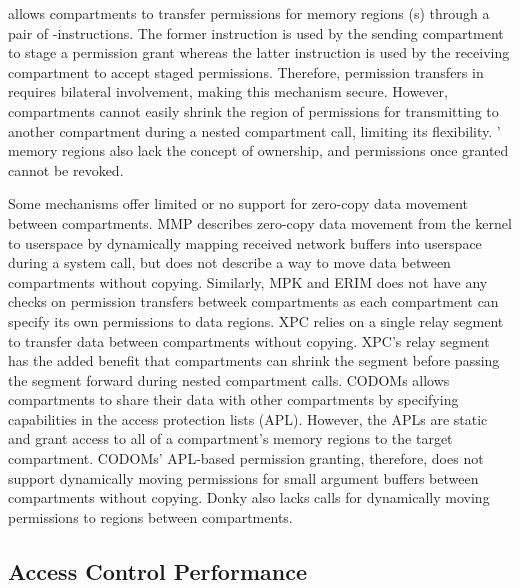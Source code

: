 \seccells allows compartments to transfer permissions for memory 
regions (\cell{}s) through a pair of \scgrant-\screcv instructions.
The former instruction is used by the sending compartment to stage a 
permission grant whereas the latter instruction is used by the receiving
compartment to accept staged permissions.
Therefore, permission transfers in \seccells requires bilateral involvement,
making this mechanism secure.
However, compartments cannot easily shrink the region of permissions
for transmitting to another compartment during a nested compartment call,
limiting its flexibility.
\seccells' memory regions also lack the concept of ownership, and
permissions once granted cannot be revoked.

Some mechanisms offer limited or no support for zero-copy data
movement between compartments.
MMP describes zero-copy data movement from the kernel to userspace
by dynamically mapping received network buffers into userspace
during a  system call, but does not describe a way to
move data between compartments without copying.
Similarly, MPK and ERIM does not have any checks on permission 
transfers betweek compartments as each compartment can specify its 
own permissions to data regions.
XPC relies on a single relay segment to transfer data between
compartments without copying.
XPC's relay segment has the added benefit that compartments
can shrink the segment before passing the segment forward during
nested compartment calls.
CODOMs allows compartments to share their data with other compartments
by specifying capabilities in the access protection lists (APL).
However, the APLs are static and grant access to all of a compartment's
memory regions to the target compartment.
CODOMs' APL-based permission granting, therefore, does not support 
dynamically moving permissions for small argument buffers between
compartments without copying.
Donky also lacks calls for dynamically moving permissions to regions
between compartments.

\subsection{Access Control Performance}






